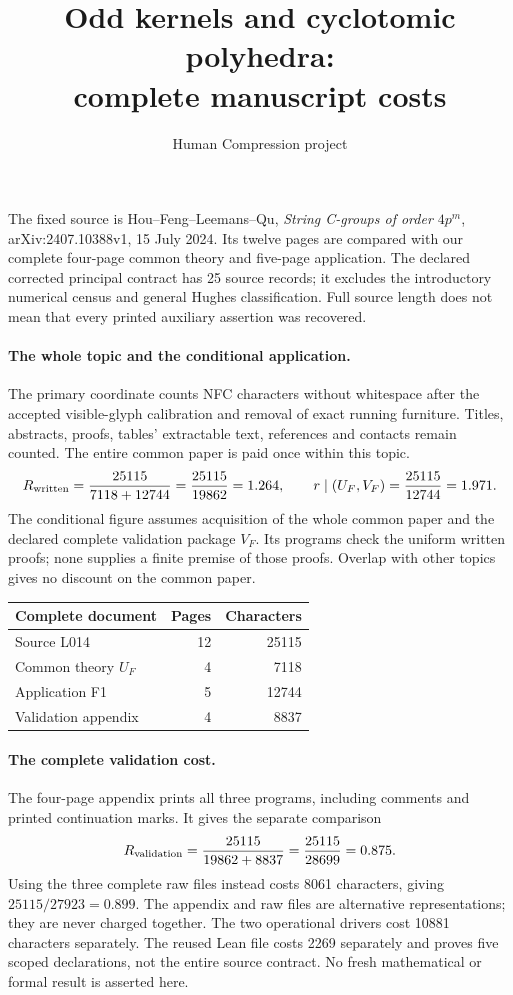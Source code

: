 \documentclass[11pt,a4paper]{article}
\title{Odd kernels and cyclotomic polyhedra:\\complete manuscript costs}
\author{Human Compression project}\date{}
\begin{document}
\maketitle
The fixed source is Hou--Feng--Leemans--Qu, \emph{String C-groups of order
$4p^m$}, arXiv:2407.10388v1, 15 July 2024. Its twelve pages are compared with
our complete four-page common theory and five-page application. The declared
corrected principal contract has 25 source records; it excludes the
introductory numerical census and general Hughes classification. Full source
length does not mean that every printed auxiliary assertion was recovered.

\paragraph{The whole topic and the conditional application.}
The primary coordinate counts NFC characters without whitespace after the
accepted visible-glyph calibration and removal of exact running furniture.
Titles, abstracts, proofs, tables' extractable text, references and contacts
remain counted. The entire common paper is paid once within this topic.
\[
 R_{\rm written}=\frac{25115}{7118+12744}
 =\frac{25115}{19862}=1.264,\qquad
 r\mid(U_F,V_F)=\frac{25115}{12744}=1.971.
\]
The conditional figure assumes acquisition of the whole common paper and
the declared complete validation package $V_F$. Its programs check the
uniform written proofs; none supplies a finite premise of those proofs.
Overlap with other topics gives no discount on the common paper.

\begin{center}\begin{tabular}{lrr}\toprule
Complete document & Pages & Characters\\\midrule
Source L014 & 12 & 25115\\
Common theory $U_F$ & 4 & 7118\\
Application F1 & 5 & 12744\\
Validation appendix & 4 & 8837\\\bottomrule
\end{tabular}\end{center}

\paragraph{The complete validation cost.}
The four-page appendix prints all three programs, including comments and
printed continuation marks. It gives the separate comparison
\[
 R_{\rm validation}=\frac{25115}{19862+8837}
 =\frac{25115}{28699}=0.875.
\]
Using the three complete raw files instead costs 8061 characters,
giving $25115/27923=0.899$. The appendix and raw files are alternative
representations; they are never charged together. The two operational
drivers cost 10881 characters separately. The reused Lean file costs
2269 separately and proves five scoped declarations, not the entire
source contract. No fresh mathematical or formal result is asserted here.
\end{document}
